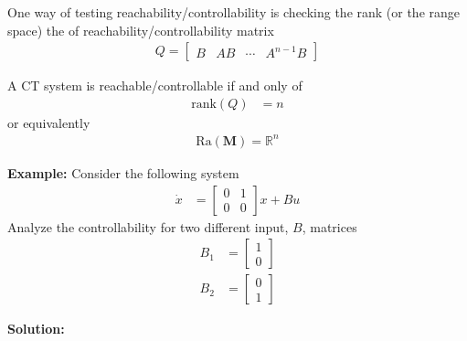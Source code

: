 \documentclass[twoside]{article}
\begin{document}
One way of testing reachability/controllability is checking the rank
(or the range space) the of reachability/controllability matrix
%
\begin{align*}
  Q = \left[ \begin{array}{cccc} B & A B & \cdots & A^{n-1} B \end{array} \right]
\end{align*} 
%

A CT system is reachable/controllable if and only of
%
\begin{align*}
  \mathrm{rank} ( Q ) &= n
\end{align*} 
%
or equivalently 
%
\begin{align*}
 \mathrm{Ra} ( \mathbf{M} ) = \mathbb{R}^n
\end{align*} 


\textbf{Example:} Consider the following system
%
\begin{align*}
  \dot{x} &= \left[ \begin{array}{cc} 0 & 1 \\ 0 & 0 \end{array}
                                                   \right] x + B u 
\end{align*}
%
Analyze the controllability for two different input, $B$,
matrices
%
\begin{align*}
 B_1 &= \left[ \begin{array}{c} 1 \\ 0 \end{array} \right] 
  \\
 B_2 &= \left[ \begin{array}{c} 0 \\ 1 \end{array} \right] 
\end{align*}
%

\textbf{Solution:}
\end{document}
